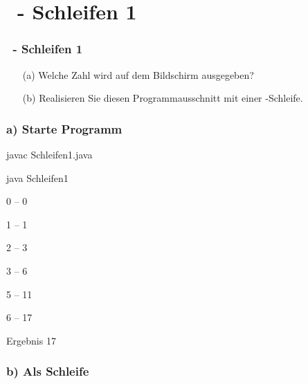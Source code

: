 \def\stitle{\theexercise\ - Schleifen 1}
\section{\stitle}
\begin{frame}[t]%
    \frametitle{\stitle}


\begin{itemize}
\item[(a)] Welche Zahl wird auf dem Bildschirm ausgegeben?
\item[(b)] Realisieren Sie diesen Programmausschnitt mit einer -Schleife.
\end{itemize}

\end{frame}


\begin{frame}[fragile]%
 \frametitle{a) Starte Programm}%

\begin{description}[style=BASH]
\item[Konsole]
\item javac Schleifen1.java
\item java Schleifen1
\item 0  --  0
\item 1  --  1
\item 2  --  3
\item 3  --  6
\item 5  --  11
\item 6  --  17
\item Ergebnis 17
\end{description}

\end{frame}


\begin{frame}[fragile]%
 \frametitle{b) Als  Schleife}%


\end{frame}
